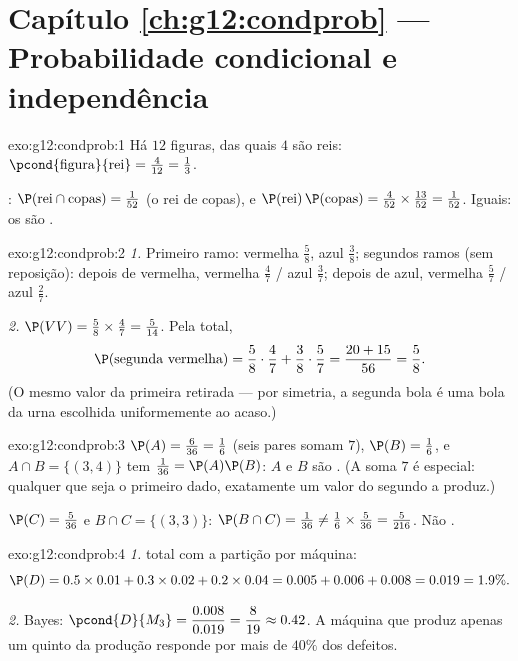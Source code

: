 \section*{Capítulo \ref{ch:g12:condprob} --- Probabilidade condicional e independência}

\begin{solution}{exo:g12:condprob:1}
Há $12$ figuras, das quais $4$ são reis:
$\pcond{\text{figura}}{\text{rei}} = \frac{4}{12} = \frac13$.

: $\P(\text{rei} \cap \text{copas}) = \frac{1}{52}$ (o rei de
copas), e
$\P(\text{rei})\,\P(\text{copas}) = \frac{4}{52}\times\frac{13}{52}
= \frac{1}{52}$. Iguais: os  são .
\end{solution}

\begin{solution}{exo:g12:condprob:2}
\emph{1.} Primeiro ramo: vermelha $\frac58$, azul $\frac38$; segundos
ramos (sem reposição): depois de vermelha, vermelha $\frac47$ / azul
$\frac37$; depois de azul, vermelha $\frac57$ / azul $\frac27$.

\emph{2.} $\P(VV) = \frac58 \times \frac47 = \frac{5}{14}$. Pela
 total,
\[
\P(\text{segunda vermelha}) = \frac58\cdot\frac47 + \frac38\cdot\frac57
= \frac{20 + 15}{56} = \frac58 .
\]
(O mesmo valor da primeira retirada --- por simetria, a segunda bola é uma
bola da urna escolhida uniformemente ao acaso.)
\end{solution}

\begin{solution}{exo:g12:condprob:3}
$\P(A) = \frac{6}{36} = \frac16$ (seis pares somam $7$),
$\P(B) = \frac16$, e $A \cap B = \{(3,4)\}$ tem 
$\frac{1}{36} = \P(A)\P(B)$: $A$ e $B$ são . (A soma $7$ é
especial: qualquer que seja o primeiro dado, exatamente um valor do
segundo a produz.)

$\P(C) = \frac{5}{36}$ e $B \cap C = \{(3,3)\}$:
$\P(B \cap C) = \frac{1}{36} \neq \frac16 \times \frac{5}{36}
= \frac{5}{216}$. Não .
\end{solution}

\begin{solution}{exo:g12:condprob:4}
\emph{1.}  total com a partição por máquina:
\[
\P(D) = 0.5\times0.01 + 0.3\times0.02 + 0.2\times0.04
= 0.005 + 0.006 + 0.008 = 0.019 = 1.9\% .
\]

\emph{2.} Bayes:
$\pcond{D}{M_3} = \dfrac{0.008}{0.019} = \dfrac{8}{19} \approx 0.42$. A
máquina que produz apenas um quinto da produção responde por mais de
$40\%$ dos defeitos.
\end{solution}

